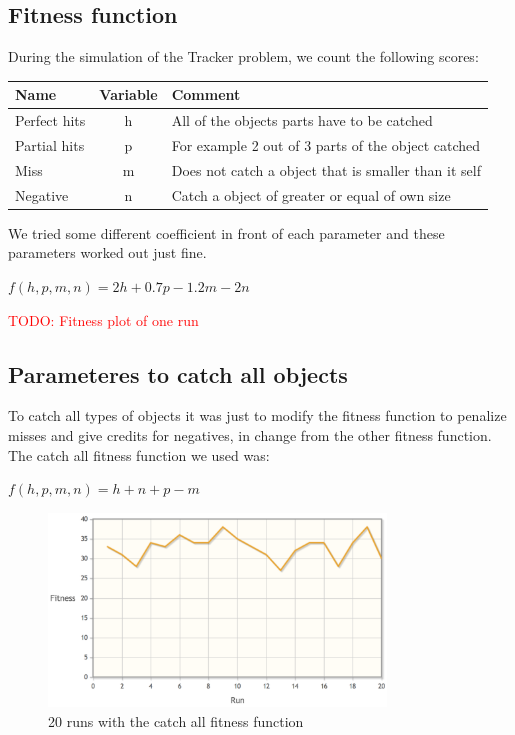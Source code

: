 \subsection{Fitness function}
During the simulation of the Tracker problem, we count the following scores:

\begin{tabular}{l | c | l}
\textbf{Name} & \textbf{Variable} & \textbf{Comment} \\
\hline
Perfect hits & h & All of the objects parts have to be catched \\
Partial hits & p & For example 2 out of 3 parts of the object catched \\
Miss & m & Does not catch a object that is smaller than it self \\
Negative & n & Catch a object of greater or equal of own size \\
\hline
\end{tabular}

We tried some different coefficient in front of each parameter and these parameters worked out just fine.

\begin{center}
$f(h,p,m,n) = 2h + 0.7p - 1.2m - 2n$
\end{center}

\textcolor{red}{TODO: Fitness plot of one run}

\subsection{Parameteres to catch all objects}
To catch all types of objects it was just to modify the fitness function to penalize misses and give credits for negatives, in change from the other fitness function. The catch all fitness function we used was:

\begin{center}
$f(h,p,m,n) = h + n + p - m$
\end{center}


\begin{figure}[h]
  \centering
    \includegraphics[width=0.8\textwidth]{img/catch_all}
    \caption{20 runs with the catch all fitness function}
\end{figure}


